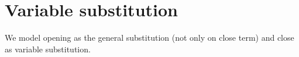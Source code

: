
\section{Variable substitution}\label{sec:var-substitution}

We model opening as the general substitution (not only on close term) and close
as variable substitution.